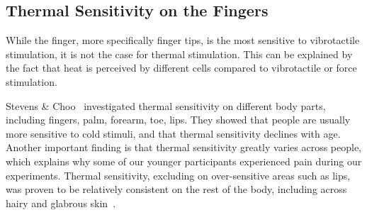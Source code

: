\documentclass[preprint,12pt]{elsarticle}
\begin{document}


\subsection{Thermal Sensitivity on the Fingers}
While the finger, more specifically finger tips, is the most sensitive to vibrotactile stimulation, it is not the case for thermal stimulation.
This can be explained by the fact that heat is perceived by different cells compared to vibrotactile or force stimulation.

Stevens \& Choo~\cite{31} investigated thermal sensitivity on different body parts, including fingers, palm, forearm, toe, lips.
They showed that people are usually more sensitive to cold stimuli, and that thermal sensitivity declines with age.
Another important finding is that thermal sensitivity greatly varies across people, which explains why some of our younger participants experienced pain during our experiments.
Thermal sensitivity, excluding on over-sensitive areas such as lips, was proven to be relatively consistent on the rest of the body, including across hairy and glabrous skin~\cite{31}.
\end{document}
